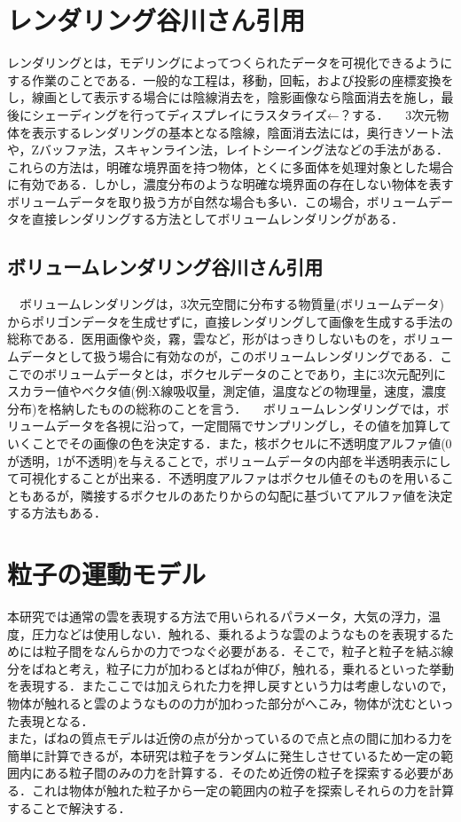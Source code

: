\documentclass[11pt]{jreport}
\begin{document}
\section{レンダリング谷川さん引用}
レンダリングとは，モデリングによってつくられたデータを可視化できるようにする作業のことである．一般的な工程は，移動，回転，および投影の座標変換をし，線画として表示する場合には陰線消去を，陰影画像なら陰面消去を施し，最後にシェーディングを行ってディスプレイにラスタライズ←？する．
　3次元物体を表示するレンダリングの基本となる陰線，陰面消去法には，奥行きソート法や，Zバッファ法，スキャンライン法，レイトシーイング法などの手法がある．これらの方法は，明確な境界面を持つ物体，とくに多面体を処理対象とした場合に有効である．しかし，濃度分布のような明確な境界面の存在しない物体を表すボリュームデータを取り扱う方が自然な場合も多い．この場合，ボリュームデータを直接レンダリングする方法としてボリュームレンダリングがある．

\subsection{ボリュームレンダリング谷川さん引用}
　ボリュームレンダリングは，3次元空間に分布する物質量(ボリュームデータ)からポリゴンデータを生成せずに，直接レンダリングして画像を生成する手法の総称である．医用画像や炎，霧，雲など，形がはっきりしないものを，ボリュームデータとして扱う場合に有効なのが，このボリュームレンダリングである．ここでのボリュームデータとは，ボクセルデータのことであり，主に3次元配列にスカラー値やベクタ値(例:X線吸収量，測定値，温度などの物理量，速度，濃度分布)を格納したものの総称のことを言う．
　ボリュームレンダリングでは，ボリュームデータを各視に沿って，一定間隔でサンプリングし，その値を加算していくことでその画像の色を決定する．また，核ボクセルに不透明度アルファ値(0が透明，1が不透明)を与えることで，ボリュームデータの内部を半透明表示にして可視化することが出来る．不透明度アルファはボクセル値そのものを用いることもあるが，隣接するボクセルのあたりからの勾配に基づいてアルファ値を決定する方法もある．


\section{粒子の運動モデル}
 本研究では通常の雲を表現する方法で用いられるパラメータ，大気の浮力，温度，圧力などは使用しない．触れる、乗れるような雲のようなものを表現するためには粒子間をなんらかの力でつなぐ必要がある．そこで，粒子と粒子を結ぶ線分をばねと考え，粒子に力が加わるとばねが伸び，触れる，乗れるといった挙動を表現する．またここでは加えられた力を押し戻すという力は考慮しないので，物体が触れると雲のようなものの力が加わった部分がへこみ，物体が沈むといった表現となる．\\
 また，ばねの質点モデルは近傍の点が分かっているので点と点の間に加わる力を簡単に計算できるが，本研究は粒子をランダムに発生しさせているため一定の範囲内にある粒子間のみの力を計算する．そのため近傍の粒子を探索する必要がある．これは物体が触れた粒子から一定の範囲内の粒子を探索しそれらの力を計算することで解決する．\\
　
\end{document}

